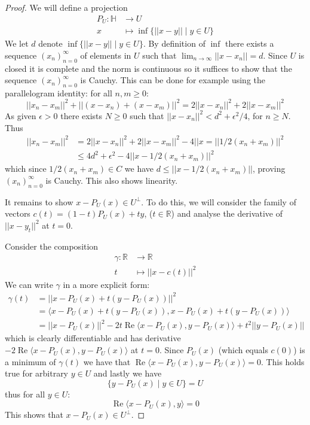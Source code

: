 \documentclass[12pt]{article}
\theoremstyle{plain}
\theoremstyle{definition}
\newcommand{\bb}[1]{\mathbb{#1}}
\newcommand{\lto}{\longrightarrow}
\begin{document}
\begin{proof}
We will define a projection
\begin{align*}
    P_U: \bb{H} &\lto U\\
    x &\longmapsto \operatorname{inf}\lbrace ||x - y|| \mid y \in U\rbrace
\end{align*}
We let $d$ denote $\operatorname{inf}\lbrace ||x - y|| \mid y \in U\rbrace$. By definition of $\operatorname{inf}$ there exists a sequence $(x_n)_{n=0}^\infty$ of elements in $U$ such that $\lim_{n\to \infty}||x - x_n|| = d$. Since $U$ is closed it is complete and the norm is continuous so it suffices to show that the sequence $(x_n)_{n=0}^\infty$ is Cauchy. This can be done for example using the parallelogram identity: for all $n,m\geq 0$:
\begin{equation}
    ||x_n - x_m||^2 + ||(x - x_n) + (x - x_m)||^2 = 2||x - x_n||^2 + 2||x - x_m||^2
\end{equation}
As given $\epsilon > 0$ there exists $N \geq 0$ such that $||x - x_n||^2 < d^2 + \epsilon^2/4$, for $n \geq N$. Thus
\begin{align*}
    ||x_n - x_m||^2 &= 2||x - x_n||^2 + 2||x - x_m||^2 - 4||x = ||1/2(x_n + x_m)||^2\\
    &\leq 4d^2 + \epsilon^2 - 4||x - 1/2(x_n + x_m)||^2
\end{align*}
which since $1/2(x_n + x_m) \in C$ we have $d \leq ||x - 1/2(x_n + x_m)||$, proving $(x_n)_{n = 0}^\infty$ is Cauchy. This also shows linearity.

It remains to show $x - P_U(x) \in U^\perp$. To do this, we will consider the family of vectors $c(t) = (1-t)P_U(x) + ty$, ($t \in \bb{R}$) and analyse the derivative of $||x - y_t||^2$ at $t = 0$.

Consider the composition
\begin{align}
    \gamma: \bb{R} &\lto \bb{R}\\
    t &\longmapsto ||x - c(t)||^2
\end{align}
We can write $\gamma$ in a more explicit form:
\begin{align*}
    \gamma(t) &= ||x - P_U(x) + t(y - P_U(x))||^2\\
    &= \big\langle x - P_U(x) + t(y - P_U(x)),x - P_U(x) + t(y - P_U(x))\big\rangle\\
    &= ||x - P_U(x)||^2 - 2t\operatorname{Re}\langle  x - P_U(x),y - P_U(x)\rangle + t^2||y - P_U(x)||
\end{align*}
which is clearly differentiable and has derivative $- 2\operatorname{Re}\langle  x - P_U(x),y - P_U(x)\rangle$ at $t = 0$. Since $P_U(x)$ (which equals $c(0)$) is a minimum of $\gamma(t)$ we have that $\operatorname{Re}\langle  x - P_U(x),y - P_U(x)\rangle = 0$. This holds true for arbitrary $y \in U$ and lastly we have
\[\lbrace y - P_U(x) \mid y \in U \rbrace = U\]
thus for all $y \in U$:
\begin{equation}
    \operatorname{Re}\langle  x - P_U(x),y\rangle = 0
\end{equation}
This shows that $x - P_U(x) \in U^\perp$.
\end{proof}
\end{document}
